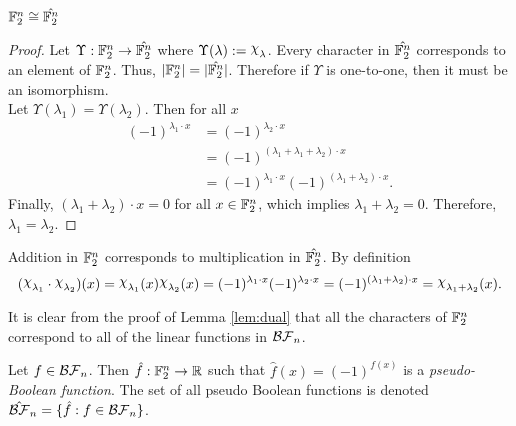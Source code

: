 \begin{lemma}\label{lem:dual}
  $\mathbb{F}_2^n\cong\hat{\mathbb{F}_2^n}$
\end{lemma}

\begin{proof}
  \par Let $\Upsilon:\mathbb{F}_2^n\rightarrow\hat{\mathbb{F}_2^n}$ where
  $\Upsilon(\lambda):=\Chi_\lambda$.
	Every character in $\hat{\mathbb{F}_2^n}$ corresponds to an element of
  $\mathbb{F}_2^n$. Thus, $\lvert\mathbb{F}_2^n\rvert=\lvert\hat{\mathbb{F}_2^n}\rvert$.
  Therefore if $\Upsilon$ is one-to-one, then it must be an isomorphism.\\
	Let $\Upsilon(\lambda_1)=\Upsilon(\lambda_2)$. Then for all $x$
	\begin{align*}
		(-1)^{\lambda_1\cdot x}
      &=(-1)^{\lambda_2\cdot x}\\
		  &=(-1)^{(\lambda_1+\lambda_1+\lambda_2)\cdot x}\\
      &=(-1)^{\lambda_1\cdot x}(-1)^{(\lambda_1+\lambda_2)\cdot x}.
	\end{align*}
	Finally, $(\lambda_1+\lambda_2)\cdot x=0$ for all $x\in\mathbb{F}_2^n$, which
  implies $\lambda_1+\lambda_2=0$. Therefore, $\lambda_1=\lambda_2$.
\end{proof}

\par Addition in $\mathbb{F}_2^n$ corresponds to multiplication in
$\hat{\mathbb{F}_2^n}$. By definition
\[
(\Chi_{\lambda_1}\cdot\Chi_{\lambda_2})(x)
  =\Chi_{\lambda_1}(x)\Chi_{\lambda_2}(x)
  =(-1)^{\lambda_1\cdot x}(-1)^{\lambda_2\cdot x}
  =(-1)^{(\lambda_1+\lambda_2)\cdot x}
  =\Chi_{\lambda_1+\lambda_2}(x).
\]

\par It is clear from the proof of Lemma \ref{lem:dual} that all the characters
of $\mathbb{F}_2^n$ correspond to all of the linear functions in $\mathcal{BF}_n$.

\begin{definition}\label{def:pBF}
  Let $f\in\mathcal{BF}_n$. Then $\hat{f}:\mathbb{F}_2^n\rightarrow\mathbb{R}$ such that
  $\hat{f}(x)=(-1)^{f(x)}$ is a \textit{pseudo-Boolean function}. The set of all
	pseudo Boolean functions is denoted $\hat{\mathcal{BF}}_n=\{\hat{f}:f\in\mathcal{BF}_n\}$.
\end{definition}

